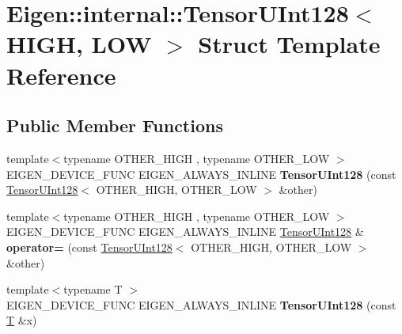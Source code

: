 \hypertarget{struct_eigen_1_1internal_1_1_tensor_u_int128}{}\section{Eigen\+:\+:internal\+:\+:Tensor\+U\+Int128$<$ H\+I\+GH, L\+OW $>$ Struct Template Reference}
\label{struct_eigen_1_1internal_1_1_tensor_u_int128}
\subsection*{Public Member Functions}
\begin{DoxyCompactItemize}
\item 
\mbox{\label{struct_eigen_1_1internal_1_1_tensor_u_int128_a1ec6a97f0a303ad5aec0b10f46b3d6b7}} 
{\footnotesize template$<$typename O\+T\+H\+E\+R\+\_\+\+H\+I\+GH , typename O\+T\+H\+E\+R\+\_\+\+L\+OW $>$ }\\E\+I\+G\+E\+N\+\_\+\+D\+E\+V\+I\+C\+E\+\_\+\+F\+U\+NC E\+I\+G\+E\+N\+\_\+\+A\+L\+W\+A\+Y\+S\+\_\+\+I\+N\+L\+I\+NE {\bfseries Tensor\+U\+Int128} (const \hyperlink{struct_eigen_1_1internal_1_1_tensor_u_int128}{Tensor\+U\+Int128}$<$ O\+T\+H\+E\+R\+\_\+\+H\+I\+GH, O\+T\+H\+E\+R\+\_\+\+L\+OW $>$ \&other)
\item 
\mbox{\label{struct_eigen_1_1internal_1_1_tensor_u_int128_a5799c262aa82de0aac673e3ffec1519f}} 
{\footnotesize template$<$typename O\+T\+H\+E\+R\+\_\+\+H\+I\+GH , typename O\+T\+H\+E\+R\+\_\+\+L\+OW $>$ }\\E\+I\+G\+E\+N\+\_\+\+D\+E\+V\+I\+C\+E\+\_\+\+F\+U\+NC E\+I\+G\+E\+N\+\_\+\+A\+L\+W\+A\+Y\+S\+\_\+\+I\+N\+L\+I\+NE \hyperlink{struct_eigen_1_1internal_1_1_tensor_u_int128}{Tensor\+U\+Int128} \& {\bfseries operator=} (const \hyperlink{struct_eigen_1_1internal_1_1_tensor_u_int128}{Tensor\+U\+Int128}$<$ O\+T\+H\+E\+R\+\_\+\+H\+I\+GH, O\+T\+H\+E\+R\+\_\+\+L\+OW $>$ \&other)
\item 
\mbox{\label{struct_eigen_1_1internal_1_1_tensor_u_int128_a87d9fe78634cd96943ef34b785c2bcdc}} 
{\footnotesize template$<$typename T $>$ }\\E\+I\+G\+E\+N\+\_\+\+D\+E\+V\+I\+C\+E\+\_\+\+F\+U\+NC E\+I\+G\+E\+N\+\_\+\+A\+L\+W\+A\+Y\+S\+\_\+\+I\+N\+L\+I\+NE {\bfseries Tensor\+U\+Int128} (const \hyperlink{group___sparse_core___module}{T} \&x)

\end{DoxyCompactItemize}
